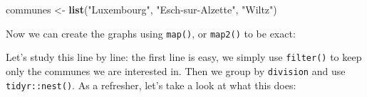 \documentclass[]{gitbook}
\newenvironment{Shaded}{\begin{snugshade}}{\end{snugshade}}
\newcommand{\DataTypeTok}[1]{\textcolor[rgb]{0.13,0.29,0.53}{#1}}
\newcommand{\DecValTok}[1]{\textcolor[rgb]{0.00,0.00,0.81}{#1}}
\newcommand{\KeywordTok}[1]{\textcolor[rgb]{0.13,0.29,0.53}{\textbf{#1}}}
\newcommand{\NormalTok}[1]{#1}
\newcommand{\OperatorTok}[1]{\textcolor[rgb]{0.81,0.36,0.00}{\textbf{#1}}}
\newcommand{\StringTok}[1]{\textcolor[rgb]{0.31,0.60,0.02}{#1}}
\theoremstyle{definition}
\theoremstyle{definition}
\theoremstyle{definition}
\theoremstyle{remark}
\begin{document}
\begin{Shaded}
\begin{Highlighting}[]
\NormalTok{communes <-}\StringTok{ }\KeywordTok{list}\NormalTok{(}\StringTok{"Luxembourg"}\NormalTok{, }\StringTok{"Esch-sur-Alzette"}\NormalTok{, }\StringTok{"Wiltz"}\NormalTok{)}
\end{Highlighting}
\end{Shaded}

Now we can create the graphs using \texttt{map()}, or \texttt{map2()} to
be exact:

\begin{Shaded}
\end{Shaded}

Let's study this line by line: the first line is easy, we simply use
\texttt{filter()} to keep only the communes we are interested in. Then
we group by \texttt{division} and use \texttt{tidyr::nest()}. As a
refresher, let's take a look at what this does:

\begin{Shaded}
\end{Shaded}
\end{document}
